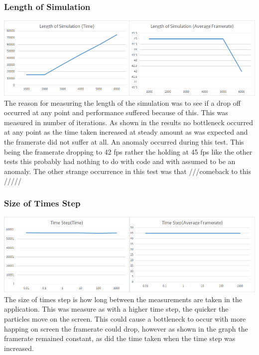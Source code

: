 \documentclass[12pt]{article}
\begin{document}
\subsubsection{Length of Simulation}
\newline
\includegraphics[scale=0.5]{pics/ialength.png}
\newline
The reason for measuring the length of the simulation was to see if a drop off occurred at any point and performance suffered because of this. This was measured in number of iterations. As shown in the results no bottleneck occurred at any point as the time taken increased at steady amount as was expected and the framerate did not suffer at all. An anomaly occurred during this test. This being the framerate dropping to 42 fps rather the holding at 45 fps like the other tests this probably had nothing to do with code and with assumed to be an anomaly. The other strange occurrence in this test was that ///comeback to this /////
\subsubsection{Size of Times Step}
\newline
\includegraphics[scale=0.5]{pics/iatime.png}
\newline
The size of times step is how long between the measurements are taken in the application. This was measure as with a higher time step, the quicker the particles move on the screen. This could cause a bottleneck to occur with more happing on screen the framerate could drop, however as shown in the graph the framerate remained constant, as did the time taken when the time step was increased.
\end{document}

